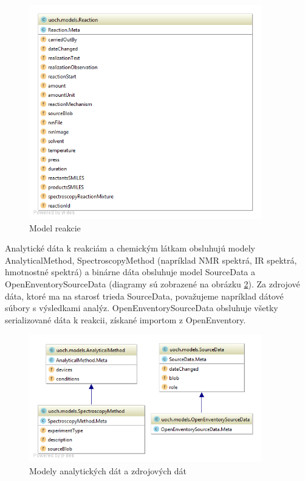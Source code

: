 \documentclass[thesis=M,slovak]{FITthesis}[2013/05/06]
\begin{document}
\begin{figure}\centering
	\includegraphics[width=0.9\textwidth]{diagramy/UOCH_Reaction.png}
 	\caption[Model reakcie]{Model reakcie}\label{graphics:Reaction}
\end{figure}

Analytické dáta k reakciám a chemickým látkam obsluhujú modely AnalyticalMethod, SpectroscopyMethod (napríklad NMR spektrá, IR spektrá, hmotnostné spektrá) a binárne dáta obsluhuje model SourceData a OpenEnventorySourceData (diagramy sú zobrazené na obrázku  \ref{graphics:AnalyticalMethod}). Za zdrojové dáta, ktoré ma na starosť trieda SourceData, považujeme napríklad dátové súbory s výsledkami analýz. OpenEnventorySourceData obsluhuje všetky serializované dáta k reakcii, získané importom z OpenEnventory.

\begin{figure}\centering
	\includegraphics[width=0.9\textwidth]{diagramy/UOCH_AnalyticalMethod_and_SourceData.png}
 	\caption[Modely analytických dát a zdrojových dát]{Modely analytických dát a zdrojových dát}\label{graphics:AnalyticalMethod}
\end{figure}
\end{document}
